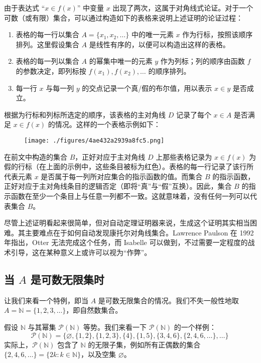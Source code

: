 由于表达式 “$x \in f(x)$” 中变量 $x$ 出现了两次，这属于对角线式论证。对于一个可数（或有限）集合，可以通过构造如下的表格来说明上述证明的论证过程：
\begin{enumerate}
\item 表格的每一行以集合 $A = \{x_1, x_2, \ldots\}$ 中的唯一元素 $x$ 作为行标，按照该顺序排列。这里假设集合 $A$ 是线性有序的，以便可以构造出这样的表格。
\item 表格的每一列以集合 $A$ 的幂集中唯一的元素 $y$ 作为列标；列的顺序由函数 $f$ 的参数决定，即列标按 $f(x_1), f(x_2), \ldots$ 的顺序排列。
\item 每一行 $x$ 与每一列 $y$ 的交点记录一个真/假的布尔值，用以表示 $x \in y$ 是否成立。
\end{enumerate}
根据为行标和列标所选定的顺序，该表格的主对角线 $D$ 记录了每个 $x \in A$ 是否满足 $x \in f(x)$ 的情况。这样的一个表格示例如下：
\begin{figure}[ht]
\centering
\texttt{[image: ./figures/4ae432a2939a8fc5.png]}
\caption{} \label{fig_KTDL_2}
\end{figure}
在前文中构造的集合 $B$，正好对应于主对角线 $D$ 上那些表格记录为 $x \in f(x)$ 为假的行标（在上面的示例中，这些条目被标为红色）。表格的每一行记录了该行所代表元素 $x$ 是否属于每一列所对应集合的指示函数的值。而集合 $B$ 的指示函数，正好对应于主对角线条目的逻辑否定（即将“真”与“假”互换）。因此，集合 $B$ 的指示函数在至少一个条目上与任意一列都不一致。这就意味着，没有任何一列可以代表集合 $B$。

尽管上述证明看起来很简单，但对自动定理证明器来说，生成这个证明其实相当困难。其主要难点在于如何自动发现康托尔对角线集合。Lawrence Paulson 在 1992 年指出，Otter 无法完成这个任务，而 Isabelle 可以做到，不过需要一定程度的战术引导，这在某种意义上或许可以视为“作弊”。
\subsection{当 $A$ 是可数无限集时}
让我们来看一个特例，即当 $A$ 是可数无限集合的情况。我们不失一般性地取 $A = \mathbb{N} = \{1, 2, 3, \ldots\}$，即自然数集合。

假设 $\mathbb{N}$ 与其幂集 $\mathcal{P}(\mathbb{N})$ 等势。我们来看一下 $\mathcal{P}(\mathbb{N})$ 的一个样例：
$$
\mathcal{P}(\mathbb{N}) = \{\varnothing, \{1,2\}, \{1,2,3\}, \{4\}, \{1,5\}, \{3,4,6\}, \{2,4,6,\dots\}, \dots\}~
$$
实际上，$\mathcal{P}(\mathbb{N})$ 包含了 $\mathbb{N}$ 的无限子集，例如所有正偶数的集合 $\{2, 4, 6, \ldots\} = \{2k : k \in \mathbb{N} \}$，以及空集 $\varnothing$。

